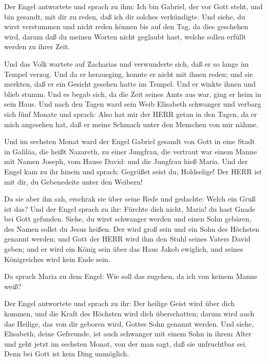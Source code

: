  Der Engel antwortete und sprach zu ihm: Ich bin Gabriel,
der vor Gott steht, und bin gesandt, mit dir zu reden, daß ich dir
solches verkündigte.  Und siehe, du wirst verstummen und
nicht reden können bis auf den Tag, da dies geschehen wird, darum daß du
meinen Worten nicht geglaubt hast, welche sollen erfüllt werden zu ihrer
Zeit.

 Und das Volk wartete auf Zacharias und verwunderte sich,
daß er so lange im Tempel verzog.  Und da er herausging,
konnte er nicht mit ihnen reden; und sie merkten, daß er ein Gesicht
gesehen hatte im Tempel. Und er winkte ihnen und blieb stumm.
 Und es begab sich, da die Zeit seines Amts aus war, ging
er heim in sein Haus.  Und nach den Tagen ward sein Weib
Elisabeth schwanger und verbarg sich fünf Monate und sprach:
 Also hat mir der HERR getan in den Tagen, da er mich
angesehen hat, daß er meine Schmach unter den Menschen von mir nähme.

 Und im sechsten Monat ward der Engel Gabriel gesandt von
Gott in eine Stadt in Galiläa, die heißt Nazareth,  zu
einer Jungfrau, die vertraut war einem Manne mit Namen Joseph, vom Hause
David: und die Jungfrau hieß Maria.  Und der Engel kam zu
ihr hinein und sprach: Gegrüßet seist du, Holdselige! Der HERR ist mit
dir, du Gebenedeite unter den Weibern!

 Da sie aber ihn sah, erschrak sie über seine Rede und
gedachte: Welch ein Gruß ist das?  Und der Engel sprach zu
ihr: Fürchte dich nicht, Maria! du hast Gnade bei Gott gefunden.
 Siehe, du wirst schwanger werden und einen Sohn gebären,
des Namen sollst du Jesus heißen.  Der wird groß sein und
ein Sohn des Höchsten genannt werden; und Gott der HERR wird ihm den
Stuhl seines Vaters David geben;  und er wird ein König
sein über das Haus Jakob ewiglich, und seines Königreiches wird kein
Ende sein.

 Da sprach Maria zu dem Engel: Wie soll das zugehen, da ich
von keinem Manne weiß?

 Der Engel antwortete und sprach zu ihr: Der heilige Geist
wird über dich kommen, und die Kraft des Höchsten wird dich
überschatten; darum wird auch das Heilige, das von dir geboren wird,
Gottes Sohn genannt werden.  Und siehe, Elisabeth, deine
Gefreunde, ist auch schwanger mit einem Sohn in ihrem Alter und geht
jetzt im sechsten Monat, von der man sagt, daß sie unfruchtbar sei.
 Denn bei Gott ist kein Ding unmöglich.


